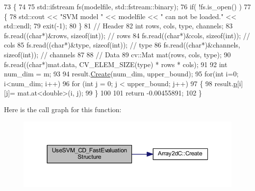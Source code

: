 \begin{DoxyCode}
73 \{
74 
75     std::ifstream fs(modelfile, std::fstream::binary);
76     \textcolor{keywordflow}{if}( !fs.is\_open() )
77     \{
78         std::cout << \textcolor{stringliteral}{"SVM model "} << modelfile << \textcolor{stringliteral}{" can not be loaded."} << std::endl;
79         exit(-1);
80     \}
81     \textcolor{comment}{// Header}
82     \textcolor{keywordtype}{int} rows, cols, type, channels;
83     fs.read((\textcolor{keywordtype}{char}*)&rows, \textcolor{keyword}{sizeof}(\textcolor{keywordtype}{int}));         \textcolor{comment}{// rows}
84     fs.read((\textcolor{keywordtype}{char}*)&cols, \textcolor{keyword}{sizeof}(\textcolor{keywordtype}{int}));         \textcolor{comment}{// cols}
85     fs.read((\textcolor{keywordtype}{char}*)&type, \textcolor{keyword}{sizeof}(\textcolor{keywordtype}{int}));         \textcolor{comment}{// type}
86     fs.read((\textcolor{keywordtype}{char}*)&channels, \textcolor{keyword}{sizeof}(\textcolor{keywordtype}{int}));     \textcolor{comment}{// channels}
87 
88     \textcolor{comment}{// Data}
89     cv::Mat mat(rows, cols, type);
90     fs.read((\textcolor{keywordtype}{char}*)mat.data, CV\_ELEM\_SIZE(type) * rows * cols);
91 
92     \textcolor{keywordtype}{int} num\_dim = m;
93 
94     result.\mbox{\hyperlink{class_array2d_c_abfe87be7641dfc586b9e7bffebcca9ec}{Create}}(num\_dim, upper\_bound);
95     \textcolor{keywordflow}{for}(\textcolor{keywordtype}{int} i=0; i<num\_dim; i++)
96         \textcolor{keywordflow}{for} (\textcolor{keywordtype}{int} j = 0; j < upper\_bound; j++)
97         \{
98             result.\mbox{\hyperlink{class_array2d_c_a727eae5d663d463635cc150e6f771f0d}{p}}[i][j]= mat.at<\textcolor{keywordtype}{double}>(i, j);
99         \}
100 
101     \textcolor{keywordflow}{return} -0.00455891;
102 \}
\end{DoxyCode}
Here is the call graph for this function\+:\nopagebreak
\begin{figure}[H]
\begin{center}
\leavevmode
\includegraphics[width=350pt]{c4-pedestrian-detector_8cpp_a891356b11fe09e40a8b2993bc8d00c01_cgraph}
\end{center}
\end{figure}

